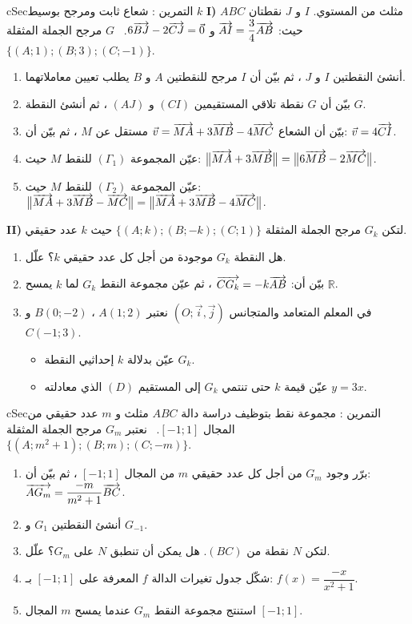 \documentclass[12pt,a4paper]{article}
\newenvironment{BOX}[2]{\begin{otherlanguage}{english}\begin{arbox}{#1}{#2}}{\end{arbox}\end{otherlanguage}}
\newcounter{exo}
\newenvironment{tamrin}[1]{\stepcounter{exo}\begin{BOX}{cSec}{التمرين \theexo: #1}}{\end{BOX}}
\newcommand{\R}{\mathbb{R}}
\newenvironment{sq}{\begin{itemize}[leftmargin=2.4em,itemsep=3pt]}{\end{itemize}}
\newcommand{\qa}{\item[(أ)]}\newcommand{\qb}{\item[(ب)]}\newcommand{\qc}{\item[(جـ)]}\newcommand{\qd}{\item[(د)]}\newcommand{\qe}{\item[(هـ)]}
\begin{document}
\begin{tamrin}{شعاع ثابت ومرجح بوسيط $k$}
\textbf{I)} $ABC$ مثلث من المستوي. $I$ و $J$ نقطتان حيث: $\overrightarrow{AI}=\dfrac34\overrightarrow{AB}$ و $6\overrightarrow{BJ}-2\overrightarrow{CJ}=\vec0$. \ $G$ مرجح الجملة المثقلة $\{(A;1);(B;3);(C;-1)\}$.
\begin{enumerate}
\item أنشئ النقطتين $I$ و $J$ ، ثم بيّن أن $I$ مرجح للنقطتين $A$ و $B$ يطلب تعيين معاملاتهما.
\item بيّن أن $G$ نقطة تلاقي المستقيمين $(CI)$ و $(AJ)$ ، ثم أنشئ النقطة $G$.
\item بيّن أن الشعاع $\vec v=\overrightarrow{MA}+3\overrightarrow{MB}-4\overrightarrow{MC}$ مستقل عن $M$ ، ثم بيّن أن: $\vec v=4\overrightarrow{CI}$.
\item عيّن المجموعة $(\Gamma_1)$ للنقط $M$ حيث: $\big\|\overrightarrow{MA}+3\overrightarrow{MB}\big\|=\big\|6\overrightarrow{MB}-2\overrightarrow{MC}\big\|$.
\item عيّن المجموعة $(\Gamma_2)$ للنقط $M$ حيث: $\big\|\overrightarrow{MA}+3\overrightarrow{MB}-\overrightarrow{MC}\big\|=\big\|\overrightarrow{MA}+3\overrightarrow{MB}-4\overrightarrow{MC}\big\|$.
\end{enumerate}
\textbf{II)} لتكن $G_k$ مرجح الجملة المثقلة $\{(A;k);(B;-k);(C;1)\}$ حيث $k$ عدد حقيقي.
\begin{enumerate}[resume]
\item هل النقطة $G_k$ موجودة من أجل كل عدد حقيقي $k$؟ علّل.
\item بيّن أن: $\overrightarrow{CG_k}=-k\overrightarrow{AB}$ ، ثم عيّن مجموعة النقط $G_k$ لما $k$ يمسح $\R$.
\item في المعلم المتعامد والمتجانس $(O;\vec i,\vec j)$ نعتبر $A(1;2)$ ، $B(0;-2)$ و $C(-1;3)$.
\begin{sq}
\qa عيّن بدلالة $k$ إحداثيي النقطة $G_k$.
\qb عيّن قيمة $k$ حتى تنتمي $G_k$ إلى المستقيم $(D)$ الذي معادلته $y=3x$.
\end{sq}
\end{enumerate}
\end{tamrin}

\begin{tamrin}{مجموعة نقط بتوظيف دراسة دالة}
$ABC$ مثلث و $m$ عدد حقيقي من المجال $[-1;1]$. \ نعتبر $G_m$ مرجح الجملة المثقلة $\{(A;m^2+1);(B;m);(C;-m)\}$.
\begin{enumerate}
\item برّر وجود $G_m$ من أجل كل عدد حقيقي $m$ من المجال $[-1;1]$ ، ثم بيّن أن: $\overrightarrow{AG_m}=\dfrac{-m}{m^2+1}\overrightarrow{BC}$.
\item أنشئ النقطتين $G_1$ و $G_{-1}$.
\item لتكن $N$ نقطة من $(BC)$. هل يمكن أن تنطبق $N$ على $G_m$؟ علّل.
\item شكّل جدول تغيرات الدالة $f$ المعرفة على $[-1;1]$ بـ: $f(x)=\dfrac{-x}{x^2+1}$.
\item استنتج مجموعة النقط $G_m$ عندما يمسح $m$ المجال $[-1;1]$.
\end{enumerate}
\end{tamrin}
\end{document}
